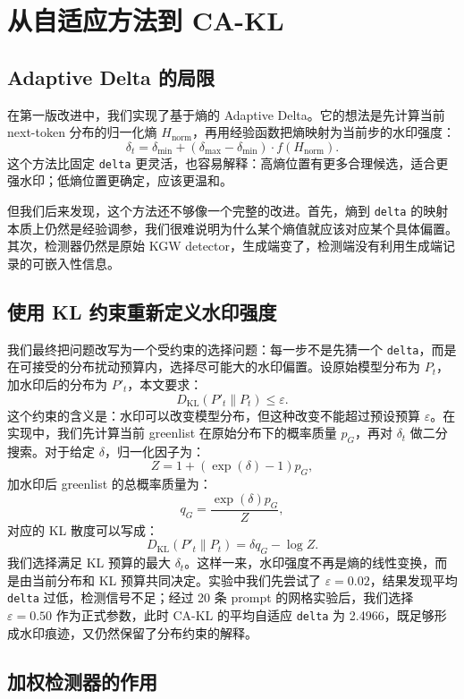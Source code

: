 \documentclass[12pt,a4paper,UTF8]{ctexart}
\newcommand{\method}{CA-KL}
\begin{document}
\section{从自适应方法到 CA-KL}

\subsection{ Adaptive Delta 的局限}

在第一版改进中，我们实现了基于熵的 Adaptive Delta。它的想法是先计算当前 next-token 分布的归一化熵 $H_{\text{norm}}$，再用经验函数把熵映射为当前步的水印强度：
\[
\delta_t=\delta_{\min}+(\delta_{\max}-\delta_{\min})\cdot f(H_{\text{norm}}).
\]
这个方法比固定 \texttt{delta} 更灵活，也容易解释：高熵位置有更多合理候选，适合更强水印；低熵位置更确定，应该更温和。

但我们后来发现，这个方法还不够像一个完整的改进。首先，熵到 \texttt{delta} 的映射本质上仍然是经验调参，我们很难说明为什么某个熵值就应该对应某个具体偏置。其次，检测器仍然是原始 KGW detector，生成端变了，检测端没有利用生成端记录的可嵌入性信息。

\subsection{使用 KL 约束重新定义水印强度}

我们最终把问题改写为一个受约束的选择问题：每一步不是先猜一个 \texttt{delta}，而是在可接受的分布扰动预算内，选择尽可能大的水印偏置。设原始模型分布为 $P_t$，加水印后的分布为 $P'_t$，本文要求：
\[
D_{\mathrm{KL}}(P'_t\|P_t)\leq \varepsilon.
\]
这个约束的含义是：水印可以改变模型分布，但这种改变不能超过预设预算 $\varepsilon$。在实现中，我们先计算当前 greenlist 在原始分布下的概率质量 $p_G$，再对 $\delta_t$ 做二分搜索。对于给定 $\delta$，归一化因子为：
\[
Z=1+(\exp(\delta)-1)p_G,
\]
加水印后 greenlist 的总概率质量为：
\[
q_G=\frac{\exp(\delta)p_G}{Z},
\]
对应的 KL 散度可以写成：
\[
D_{\mathrm{KL}}(P'_t\|P_t)=\delta q_G-\log Z.
\]
我们选择满足 KL 预算的最大 $\delta_t$。这样一来，水印强度不再是熵的线性变换，而是由当前分布和 KL 预算共同决定。实验中我们先尝试了 $\varepsilon=0.02$，结果发现平均 \texttt{delta} 过低，检测信号不足；经过 20 条 prompt 的网格实验后，我们选择 $\varepsilon=0.50$ 作为正式参数，此时 \method{} 的平均自适应 \texttt{delta} 为 2.4966，既足够形成水印痕迹，又仍然保留了分布约束的解释。

\subsection{加权检测器的作用}
\end{document}
